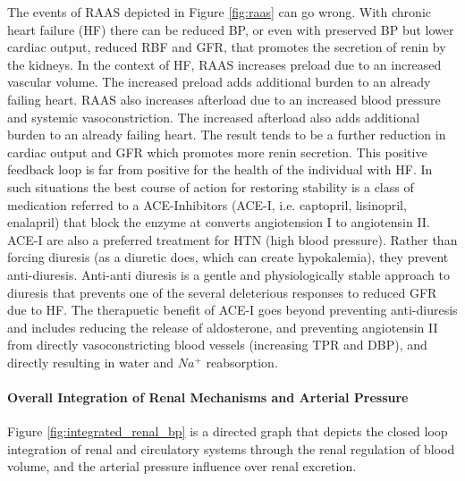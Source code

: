 The events of RAAS depicted in Figure \ref{fig:raas} can go wrong. With chronic heart failure (HF) there can be reduced BP, or even with preserved BP but lower cardiac output, reduced RBF and GFR, that promotes the secretion of renin by the kidneys. In the context of HF, RAAS increases preload due to an increased vascular volume. The increased preload adds additional burden to an already failing heart. RAAS also increases afterload due to an increased blood pressure and systemic vasoconstriction. The increased afterload also adds additional burden to an already failing heart. The result tends to be a further reduction in cardiac output and GFR which promotes more renin secretion. This positive feedback loop is far from positive for the health of the individual with HF. In such situations the best course of action for restoring stability is a class of medication referred to a ACE-Inhibitors (ACE-I, i.e. captopril, lisinopril, enalapril) that block the enzyme at converts angiotension I to angiotensin II. ACE-I are also a preferred treatment for HTN (high blood pressure). Rather than forcing diuresis (as a diuretic does, which can create hypokalemia), they prevent anti-diuresis. Anti-anti diuresis is a gentle and physiologically stable approach to diuresis that prevents one of the several deleterious responses to reduced GFR due to HF. The therapuetic benefit of ACE-I goes beyond preventing anti-diuresis and includes reducing the release of aldosterone, and preventing angiotensin II from directly vasoconstricting blood vessels (increasing TPR and DBP), and directly resulting in water and $Na^+$ reabsorption.

\paragraph{Overall Integration of Renal Mechanisms and Arterial Pressure}

Figure \ref{fig:integrated_renal_bp} is a directed graph that depicts the closed loop integration of renal and circulatory systems through the renal regulation of blood volume, and the arterial pressure influence over renal excretion. 

